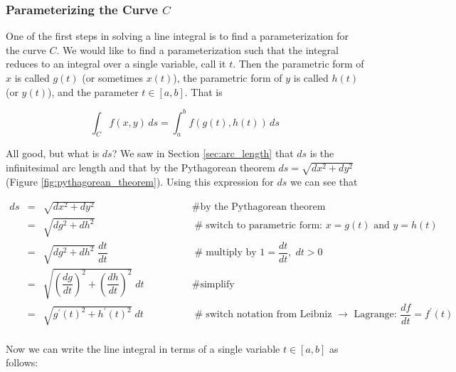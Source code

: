 \documentclass{article}
\theoremstyle{definition}
\begin{document}
\subsubsection{Parameterizing the Curve ${C}$}
\label{subsubsec:parameterizing_the_curve_C}
One of the first steps in solving a line integral is to find a
parameterization for the curve $C$. We would like to find a
parameterization such that the integral reduces to an integral
over a single variable, call it $t$.  Then the parametric form of
$x$ is called $g(t)$ (or sometimes $x(t)$), the parametric form
of $y$ is called $h(t)$ (or $y(t)$), and the parameter $t \in
[a,b]$.  That is


\begin{equation*}
 \int_{C} f(x,y) \, ds = \int_{a}^{b} f(g(t),h(t)) \, ds 
\end{equation*}

\bigskip
{}
\noindent
All good, but what is $ds$? We saw in Section
\ref{sec:arc_length} that $ds$ is the infinitesimal arc length
and that by the Pythagorean theorem $ds = \sqrt{dx^2 + dy^2}$
(Figure \ref{fig:pythagorean_theorem}). Using this expression for
$ds$ we can see that


\smallskip
\begin{equation*}
\begin{array}{lllll}
ds
&=& \sqrt{dx^2 + dy^2}				
			&\qquad \qquad \mathrel{\#} \text{by the Pythagorean theorem} \\
[12pt]
&=& \sqrt{dg^2 + dh^2}	
			&\qquad \qquad \mathrel{\#} \text{switch to parametric form: 
			$x = g(t)$ and $y = h(t)$} \\
[12pt]
&=& \sqrt{dg^2 + dh^2} \; \dfrac{dt}{dt}
			&\qquad \qquad \mathrel{\#} \text{multiply by 
			$1 = \dfrac{dt}{dt}, \; dt > 0$}  \\
[12pt]
&=& \sqrt{\left (\dfrac{dg}{dt} \right)^2 + \left (\dfrac{dh}{dt} \right)^2} \; dt		
			&\qquad \qquad \mathrel{\#} \text{simplify} \\
[12pt]
&=& \sqrt{g^{\prime}(t)^2 + h^{\prime}(t)^2} \;  dt		
			&\qquad \qquad \mathrel{\#} \text{switch notation from Leibniz $\to$ Lagrange: 
			$\dfrac{df}{dt} = f^{\prime}(t)$} \\	
\end{array}
\end{equation*}

\bigskip
\noindent
Now we can write the line integral in terms of a single
variable $t \in [a,b]$ as follows: 
\end{document}
